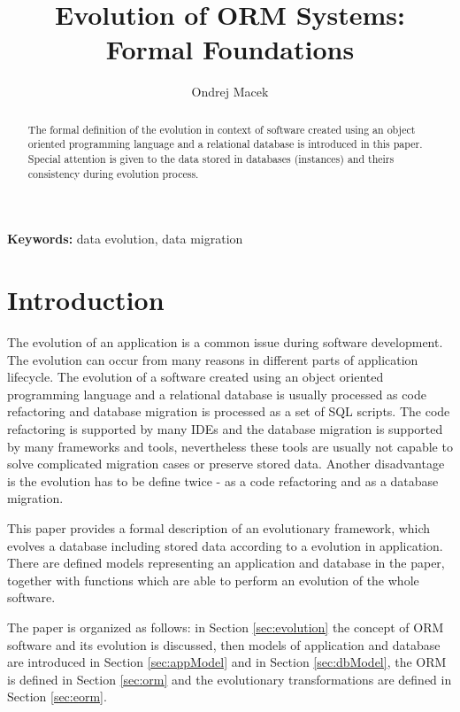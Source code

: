 \documentclass[11pt]{article}
\title{Evolution of ORM Systems: Formal Foundations}
\author{Ondrej Macek}
\begin{document}
\tableofcontents \newpage

\maketitle
\begin{abstract}
The formal definition of the evolution in context of  software created using an object oriented programming language and a relational database is introduced in this paper. Special attention is given to the data stored in databases (instances) and theirs consistency during evolution process.
\end{abstract}

\textbf{Keywords:} data evolution, data migration
\section{Introduction}
The evolution of an application is a common issue during software development. The evolution can occur from many reasons in different parts of application lifecycle. The evolution of a software  created using an object oriented programming language and a relational database is usually processed as code refactoring and database migration is processed as a set of SQL scripts. The code refactoring is supported by many IDEs and the database migration is supported by many frameworks and tools, nevertheless these tools are usually not capable to solve complicated migration cases or preserve stored data. Another disadvantage is the evolution has to be define twice - as a code refactoring and as a database migration.

This paper provides a formal description of an evolutionary framework, which evolves a database including stored data according to a evolution in application. There are defined models representing an application and database in the paper, together with functions which are able to perform an evolution of the whole software.

The paper is organized as follows: in Section \ref{sec:evolution} the concept of ORM software and its evolution is discussed, then models of application and database are introduced in Section \ref{sec:appModel} and in Section \ref{sec:dbModel}, the ORM is defined in Section \ref{sec:orm} and the evolutionary transformations are defined in Section \ref{sec:eorm}.
\end{document}
